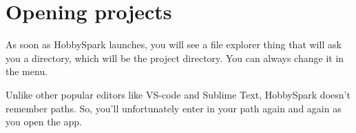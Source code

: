 	\section{Opening projects}
	As soon as HobbySpark launches, you will see a file explorer thing that will ask you a directory, which will be the project directory. You can always change it in the menu. 
	
	Unlike other popular editors like VS-code and Sublime Text, HobbySpark doesn't remember paths. So, you'll unfortunately enter in your path again and again as you open the app.
    